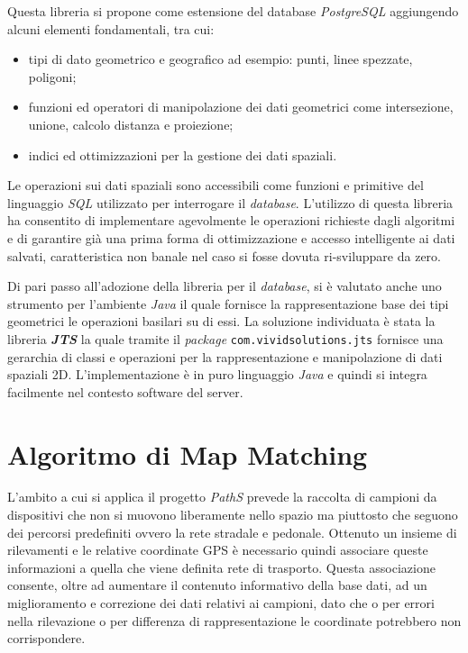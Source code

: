 Questa libreria si propone come estensione del database \emph{PostgreSQL} aggiungendo alcuni elementi fondamentali, tra cui:
\begin{itemize}
\item tipi di dato geometrico e geografico ad esempio: punti, linee spezzate, poligoni;
\item funzioni ed operatori di manipolazione dei dati geometrici come intersezione, unione, calcolo distanza e proiezione;
\item indici ed ottimizzazioni per la gestione dei dati spaziali.
\end{itemize}
Le operazioni sui dati spaziali sono accessibili come funzioni e primitive del linguaggio \emph{SQL} utilizzato per interrogare il \emph{database}. L'utilizzo di questa libreria ha consentito di implementare agevolmente le operazioni richieste dagli algoritmi e di garantire già una prima forma di ottimizzazione e accesso intelligente ai dati salvati, caratteristica non banale nel caso si fosse dovuta ri-sviluppare da zero.

Di pari passo all'adozione della libreria per il \emph{database}, si è valutato anche uno strumento per l'ambiente \emph{Java} il quale fornisce la rappresentazione base dei tipi geometrici le operazioni basilari su di essi. La soluzione individuata è stata la libreria \textbf{\emph{JTS}} \cite{jts} la quale tramite il \emph{package} \texttt{com.\-vividsolutions.\-jts} fornisce una gerarchia di classi e operazioni per la rappresentazione e manipolazione di dati spaziali 2D. L'implementazione è in puro linguaggio \emph{Java} e quindi si integra facilmente nel contesto software del server.


\section{Algoritmo di Map Matching}
L'ambito a cui si applica il progetto \emph{PathS} prevede la raccolta di campioni da dispositivi che non si muovono liberamente nello spazio ma piuttosto che seguono dei percorsi predefiniti ovvero la rete stradale e pedonale. Ottenuto un insieme di rilevamenti e le relative coordinate GPS è necessario quindi associare queste informazioni a quella che viene definita rete di trasporto. Questa associazione consente, oltre ad aumentare il contenuto informativo della base dati, ad un miglioramento e correzione dei dati relativi ai campioni, dato che o per errori nella rilevazione o per differenza di rappresentazione le coordinate potrebbero non corrispondere. 

